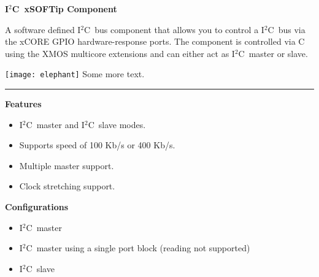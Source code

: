 \documentclass[a4paper, 11pt,final,hyphenatedtitles]{article}
\newcommand{\iic}{I$^2$C~}
\begin{document}
\noindent\begin{minipage}{\textwidth}

\noindent\begin{minipage}[b]{.6\textwidth}
{{\Huge\sffamily\bfseries\flushleft \iic xSOFTip Component}}
\vspace{\baselineskip}

\noindent
A software defined \iic bus component that allows you to control a
\iic bus via the xCORE GPIO hardware-response ports. The component
is controlled via C using the XMOS multicore extensions and can
either act as \iic master or slave.
\end{minipage} 
\hfill
\begin{minipage}[b]{.3\textwidth}
\texttt{[image: elephant]}
Some more text.
\end{minipage}

\end{minipage}
\vspace{0.5\baselineskip}

\noindent\rule{\textwidth}{1.5pt}

{{\Large\sffamily\bfseries\flushleft Features}}

\begin{itemize}
\item \iic master and \iic slave modes.
\item Supports speed of 100 Kb/s or 400 Kb/s.
\item Multiple master support.
\item Clock stretching support.
\end{itemize}

{{\Large\sffamily\bfseries\flushleft Configurations}}

\begin{itemize}
\item \iic master
\item \iic master using a single port block (reading not supported)
\item \iic slave
\end{itemize}
\end{document}
